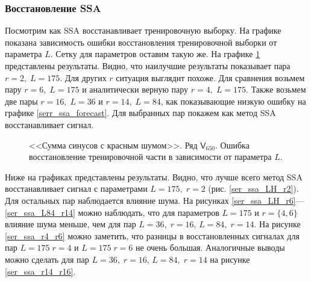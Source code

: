 \documentclass[specialist,
               substylefile = spbu.rtx,
               subf,href,colorlinks=true, 12p]{disser}
\newcommand{\multiref}[2]{\ref{#1}---\ref{#2}}
\begin{document}
\subsubsection{Восстановление SSA}

Посмотрим как SSA восстанавливает тренировочную выборку. На графике показана зависимость ошибки восстановления тренировочной выборки от параметра $L$. Сетку для параметров оставим такую же. На графике \ref{serr_ssa_reconstruct} представлены результаты. Видно, что наилучшие результаты показывает пара $r = 2, \; L = 175$. Для других $r$ ситуация выглядит похоже. Для сравнения возьмем пару $r = 6, \; L = 175$ и аналитически верную пару $r = 4, \; L = 175$. Также возьмем две пары $r = 16, \; L = 36$ и $r = 14, \; L = 84$, как показывающие низкую ошибку на графике \ref{serr_ssa_forecast}. Для выбранных пар покажем как метод SSA восстанавливает сигнал.

\begin{figure}[H]
	\captionsetup{justification=centering}
	\caption{<<Сумма синусов с красным шумом>>. Ряд $\mathsf{V}_{650}$. Ошибка восстановление тренировочной части в зависимости от параметра $L$.}
	\label{serr_ssa_reconstruct}
\end{figure}

Ниже на графиках представлены результаты. Видно, что лучше всего метод SSA восстанавливает сигнал с параметрами $L = 175, \; r = 2$ (рис. \ref{ser_ssa_LH_r2}). Для остальных пар наблюдается влияние шума. На рисунках \multiref{ser_ssa_LH_r6}{ser_ssa_L84_r14} можно наблюдать, что для параметров $L = 175$ и $r = \{4, 6\}$ влияние шума меньше, чем для пар $L = 36, \; r = 16$, $L = 84, \; r = 14$. На рисунке \ref{ser_ssa_r4_r6} можно заметить, что разницы в восстановленных сигналах для пар $L = 175 \; r = 4$ и $L = 175 \; r = 6$ не очень большая. Аналогичные выводы можно сделать для пар $L = 36, \; r = 16$, $L = 84, \; r = 14$ на рисунке \ref{ser_ssa_r14_r16}.
\end{document}
